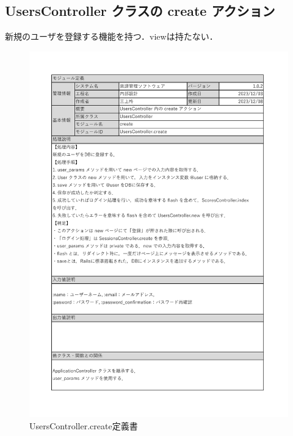 \subsection*{UsersController クラスの create アクション}
新規のユーザを登録する機能を持つ．viewは持たない．
\begin{figure}[H]
    \centering
    \includegraphics[scale=0.6]{img/Users/xlsx/UsersController_create.pdf}
    \vspace{-1cm}
    \caption{UsersController.create定義書}
\end{figure}
